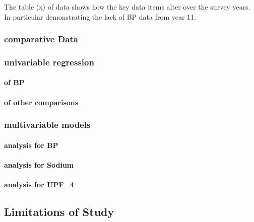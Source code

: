 \documentclass[
]{article}
\begin{document}
The table (x) of data shows how the key data items alter over the survey
years. In particular demonstrating the lack of BP data from year 11.

\hypertarget{comparative-data}{%
\subsubsection{comparative Data}\label{comparative-data}}

\hypertarget{univariable-regression}{%
\subsubsection{univariable regression}\label{univariable-regression}}

\hypertarget{of-bp}{%
\paragraph{of BP}\label{of-bp}}

\hypertarget{of-other-comparisons}{%
\paragraph{of other comparisons}\label{of-other-comparisons}}

\hypertarget{multivariable-models}{%
\subsubsection{multivariable models}\label{multivariable-models}}

\hypertarget{analysis-for-bp}{%
\paragraph{analysis for BP}\label{analysis-for-bp}}

\hypertarget{analysis-for-sodium}{%
\paragraph{analysis for Sodium}\label{analysis-for-sodium}}

\hypertarget{analysis-for-upf_4}{%
\paragraph{analysis for UPF\_4}\label{analysis-for-upf_4}}

\hypertarget{limitations-of-study}{%
\subsection{Limitations of Study}\label{limitations-of-study}}
\end{document}
